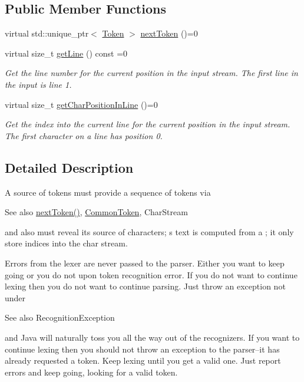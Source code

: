\subsection*{Public Member Functions}
\begin{DoxyCompactItemize}
\item 
virtual std\+::unique\+\_\+ptr$<$ \hyperlink{classantlr4_1_1Token}{Token} $>$ \hyperlink{classantlr4_1_1TokenSource_a41e3a36074ba6dcd3e0dab9250d4b179}{next\+Token} ()=0
\item 
virtual size\+\_\+t \hyperlink{classantlr4_1_1TokenSource_a3b5d8cfd192fd9b9e4518010e600c714}{get\+Line} () const =0
\begin{DoxyCompactList}\small\item\em Get the line number for the current position in the input stream. The first line in the input is line 1. \end{DoxyCompactList}\item 
virtual size\+\_\+t \hyperlink{classantlr4_1_1TokenSource_a69822a3dcbce1bd4ca407626a2420e4d}{get\+Char\+Position\+In\+Line} ()=0
\begin{DoxyCompactList}\small\item\em Get the index into the current line for the current position in the input stream. The first character on a line has position 0. \end{DoxyCompactList}\end{DoxyCompactItemize}


\subsection{Detailed Description}
A source of tokens must provide a sequence of tokens via \begin{DoxySeeAlso}{See also}
\hyperlink{classantlr4_1_1TokenSource_a41e3a36074ba6dcd3e0dab9250d4b179}{next\+Token()}, \hyperlink{classantlr4_1_1CommonToken}{Common\+Token}, Char\+Stream


\end{DoxySeeAlso}
and also must reveal it\textquotesingle{}s source of characters; \textquotesingle{}s text is computed from a ; it only store indices into the char stream. 

Errors from the lexer are never passed to the parser. Either you want to keep going or you do not upon token recognition error. If you do not want to continue lexing then you do not want to continue parsing. Just throw an exception not under \begin{DoxySeeAlso}{See also}
Recognition\+Exception


\end{DoxySeeAlso}
and Java will naturally toss you all the way out of the recognizers. If you want to continue lexing then you should not throw an exception to the parser--it has already requested a token. Keep lexing until you get a valid one. Just report errors and keep going, looking for a valid token. 



